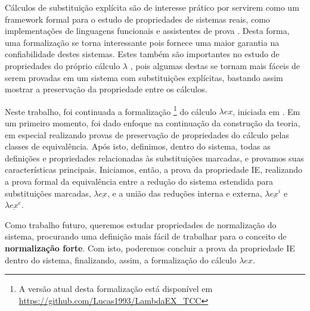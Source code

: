 Cálculos de substituição explícita são de interesse prático por servirem como um
framework formal para o estudo de propriedades de sistemas reais, como
implementações de linguagens funcionais e assistentes de prova \cite{levy1999}.
Desta forma, uma formalização se torna interessante pois fornece uma maior
garantia na confiabilidade destes sistemas. Estes também são importantes no
estudo de propriedades do próprio cálculo $\lambda$ \cite{ben_cbv, ben_beta},
pois algumas destas se tornam mais fáceis de serem provadas em um sistema com
substituições explícitas, bastando assim mostrar a preservação da propriedade
entre os cálculos.

Neste trabalho, foi continuada a formalização \footnote{ A versão atual desta
    formalização está disponível em
    \url{https://github.com/Lucas1993/LambdaEX_TCC}} do cálculo $\lambda ex$,
iniciada em \cite{initial}. Em um primeiro momento, foi dado enfoque na
continuação da construção da teoria, em especial realizando provas de
preservação de propriedades do cálculo pelas classes de equivalência. Após isto,
definimos, dentro do sistema, todas as definições e propriedades relacionadas às
substituições marcadas, e provamos suas características principais. Iniciamos,
então, a prova da propriedade IE, realizando a prova formal da equivalência
entre a redução do sistema estendida para substituições marcadas, $\lambda
\underline{ex}$, e a união das reduções interna e externa, $\lambda
\underline{ex}^i$ e $\lambda \underline{ex}^e$.

Como trabalho futuro, queremos estudar propriedades de normalização do sistema,
procurando uma definição mais fácil de trabalhar para o conceito de
\textbf{normalização forte}. Com isto, poderemos concluir a prova da propriedade
IE dentro do sistema, finalizando, assim, a formalização do cálculo $\lambda
ex$.

